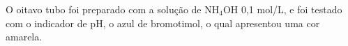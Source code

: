 \begin{figure}
            \label{fig:experimento16}
        \end{figure}

        \newpage

        \indent O oitavo tubo foi preparado com a solução de NH$_4$OH 0,1 mol/L, e foi testado com o indicador de pH, o azul de bromotimol, o qual apresentou uma cor amarela.

